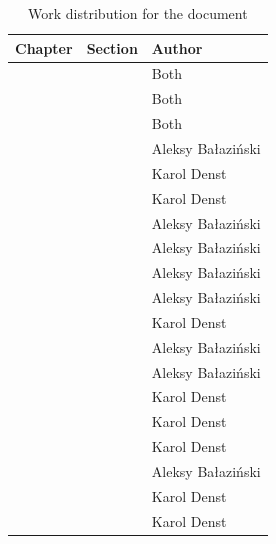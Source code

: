 \begin{table}[h]
    \centering
    \begin{tabular}{|l|l|l|}
    \hline
    Chapter  & Section    & Author        \\ \hline
    \nameref{ch:introduction} &  & Both \\
    \nameref{ch:division_of_work} &  & Both \\
    \nameref{ch:functional_specification} & & Both \\
    \nameref{ch:theoretical_foundations} & \nameref{sec:non_euclidean_geometry} & Aleksy Bałaziński      \\
    \nameref{ch:theoretical_foundations} & \nameref{sec:theory_theory_marching_cubes} & Karol Denst      \\
    \nameref{ch:theoretical_foundations} & \nameref{sec:theory_theory_models} & Karol Denst      \\
    \nameref{ch:theoretical_foundations} & \nameref{sec:theory_theory_day_night_cycle} & Aleksy Bałaziński      \\
    \nameref{ch:theoretical_foundations} & \nameref{sec:theory_theory_lighting} & Aleksy Bałaziński      \\
    \nameref{ch:implementation} & \nameref{sec:technologies_selection} & Aleksy Bałaziński      \\
    \nameref{ch:implementation} & \nameref{sec:game_objects_management} & Aleksy Bałaziński      \\
    \nameref{ch:implementation} & \nameref{sec:implementation_terrain} & Karol Denst      \\
    \nameref{ch:implementation} & \nameref{sec:chunk-worker} & Aleksy Bałaziński      \\
    \nameref{ch:implementation} & \nameref{sec:implementation_rendering} & Aleksy Bałaziński      \\
    \nameref{ch:implementation} & \nameref{sec:two_dimensional_graphics} & Karol Denst      \\
    \nameref{ch:testing} & & Karol Denst \\
    \nameref{ch:user_manual} & & Karol Denst \\
    \nameref{ch:results} & & Aleksy Bałaziński \\
    \nameref{ch:problems} & & Karol Denst \\
    \nameref{ch:improvements} & & Karol Denst \\
    \hline
    \end{tabular}
    \caption{Work distribution for the document}
    \label{tab:division_of_work_on_the_document}
\end{table}